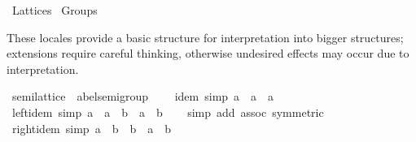 %
\begin{isabellebody}%
%
%
\isadelimdocument
%
\endisadelimdocument
%
\isatagdocument
%
\isamarkuptrue%
%
\endisatagdocument
{\isafolddocument}%
%
\isadelimdocument
%
\endisadelimdocument
%
\isadelimtheory
%
\endisadelimtheory
%
\isatagtheory
{}\isamarkupfalse%
\ Lattices\isanewline
{}\ Groups\isanewline
{}%
\endisatagtheory
{\isafoldtheory}%
%
\isadelimtheory
%
\endisadelimtheory
%
\isadelimdocument
%
\endisadelimdocument
%
\isatagdocument
%
\isamarkuptrue%
%
\endisatagdocument
{\isafolddocument}%
%
\isadelimdocument
%
\endisadelimdocument
%
\begin{isamarkuptext}%
These locales provide a basic structure for interpretation into
  bigger structures;  extensions require careful thinking, otherwise
  undesired effects may occur due to interpretation.%
\end{isamarkuptext}\isamarkuptrue%
\isamarkupfalse%
\ semilattice\ {\isacharequal}{\kern0pt}\ abel{\isacharunderscore}{\kern0pt}semigroup\ {\isacharplus}{\kern0pt}\isanewline
\ \ \ idem\ {\isacharbrackleft}{\kern0pt}simp{\isacharbrackright}{\kern0pt}{\isacharcolon}{\kern0pt}\ {\isachardoublequoteopen}a\ \isactrlbold {\isacharasterisk}{\kern0pt}\ a\ {\isacharequal}{\kern0pt}\ a{\isachardoublequoteclose}\isanewline
{}\isanewline
\isanewline
{}\isamarkupfalse%
\ left{\isacharunderscore}{\kern0pt}idem\ {\isacharbrackleft}{\kern0pt}simp{\isacharbrackright}{\kern0pt}{\isacharcolon}{\kern0pt}\ {\isachardoublequoteopen}a\ \isactrlbold {\isacharasterisk}{\kern0pt}\ {\isacharparenleft}{\kern0pt}a\ \isactrlbold {\isacharasterisk}{\kern0pt}\ b{\isacharparenright}{\kern0pt}\ {\isacharequal}{\kern0pt}\ a\ \isactrlbold {\isacharasterisk}{\kern0pt}\ b{\isachardoublequoteclose}\isanewline
%
\isadelimproof
\ \ %
\endisadelimproof
%
\isatagproof
{}\isamarkupfalse%
\ {\isacharparenleft}{\kern0pt}simp\ add{\isacharcolon}{\kern0pt}\ assoc\ {\isacharbrackleft}{\kern0pt}symmetric{\isacharbrackright}{\kern0pt}{\isacharparenright}{\kern0pt}%
\endisatagproof
{\isafoldproof}%
%
\isadelimproof
\isanewline
%
\endisadelimproof
\isanewline
{}\isamarkupfalse%
\ right{\isacharunderscore}{\kern0pt}idem\ {\isacharbrackleft}{\kern0pt}simp{\isacharbrackright}{\kern0pt}{\isacharcolon}{\kern0pt}\ {\isachardoublequoteopen}{\isacharparenleft}{\kern0pt}a\ \isactrlbold {\isacharasterisk}{\kern0pt}\ b{\isacharparenright}{\kern0pt}\ \isactrlbold {\isacharasterisk}{\kern0pt}\ b\ {\isacharequal}{\kern0pt}\ a\ \isactrlbold {\isacharasterisk}{\kern0pt}\ b{\isachardoublequoteclose}\isanewline

\end{isabellebody}
